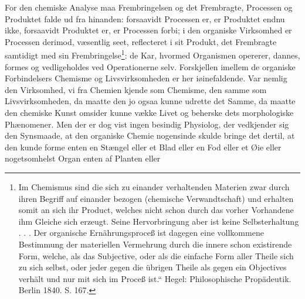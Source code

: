 \documentclass[12pt,a4paper]{book}
\begin{document}
For den chemiske Analyse maa Frembringelsen og det Frembragte,
Processen og Produktet falde ud fra hinanden: forsaavidt Processen
er, er Produktet endnu ikke, forsaavidt Produktet er, er Processen
forbi; i den organiske Virksomhed er Processen derimod, væsentlig
seet, reflecteret i sit Produkt, det Frembragte samtidigt med sin
Frembringelse\footnote{%
Im Chemismus sind die sich zu einander verhaltenden Materien zwar
durch ihren Begriff auf einander bezogen (chemische
Verwandtschaft) und erhalten somit an sich ihr Product, welches
nicht schon durch das vorher Vorhandene ihm Gleiche sich erzeugt.
Seine Hervorbringung aber ist keine Selbsterhaltung . . . Der
organische Ernährungsproceß ist dagegen eine vollkommene
Bestimmung der materiellen Vermehrung durch die innere schon
existirende Form, welche, als das Subjective, oder als die einfache
Form aller Theile sich zu sich selbst, oder jeder gegen die
übrigen Theile als gegen ein Objectives verhält und nur mit sich
im Proceß ist.“ Hegel: Philosophische Propädeutik. Berlin 1840.
S. 167.}: de Kar, hvormed
\setcounter{footnote}{0}
Organismen opererer, dannes, formes og vedligeholdes ved
Operationerne selv. Forskjellen imellem de organiske Forbindelsers
Chemisme og Livsvirksomheden er her iøinefaldende. Var nemlig den
Virksomhed, vi fra Chemien kjende som Chemisme, den samme som
Livsvirksomheden, da maatte den jo ogsaa kunne udrette det Samme,
da maatte den chemiske Kunst omsider kunne vække Livet og beherske
dets morphologiske Phænomener. Men der er dog vist ingen besindig
Physiolog, der vedkjender sig den Synsmaade, at den organiske
Chemie nogensinde skulde bringe det dertil, at den kunde forme
enten en Stængel eller et Blad eller en Fod eller et Øie eller
nogetsomhelst Organ enten af Planten eller
\end{document}
